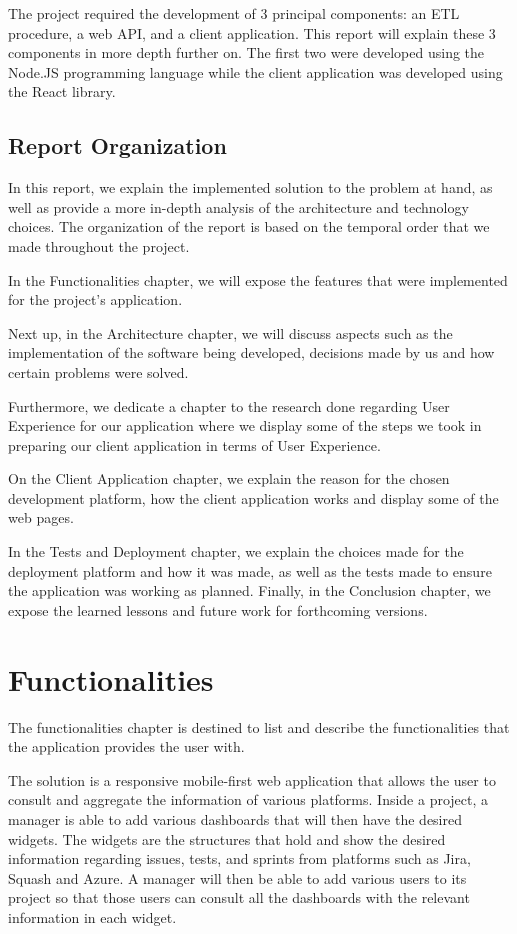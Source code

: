 \documentclass[a4paper,twoside,10pt]{report}
\begin{document}
The project required the development of 3 principal components: an ETL procedure, a web API, and a client application. This report will explain these 3 components in more depth further on.
The first two were developed using the Node.JS programming language while the client application was developed using the React library.

\section{Report Organization}
In this report, we explain the implemented solution to the problem at hand, as well as provide a more in-depth analysis of the architecture and technology choices. The organization of the report is based on the temporal order that we made throughout the project.

In the Functionalities chapter, we will expose the features that were implemented for the project's application.

Next up, in the Architecture chapter, we will discuss aspects such as the implementation of the software being developed, decisions made by us and how certain problems were solved.

Furthermore, we dedicate a chapter to the research done regarding User Experience for our application where we display some of the steps we took in preparing our client application in terms of User Experience.

On the Client Application chapter, we explain the reason for the chosen development platform, how the client application works and display some of the web pages.  

In the Tests and Deployment chapter, we explain the choices made for the deployment platform and how it was made, as well as the tests made to ensure the application was working as planned. Finally, in the Conclusion chapter, we expose the learned lessons and future work for forthcoming versions.

\chapter{Functionalities}

The functionalities chapter is destined to list and describe the functionalities that the application provides the user with.

The solution is a responsive mobile-first web application that allows the user to consult and aggregate the information of various platforms. Inside a project, a manager is able to add various dashboards that will then have the desired widgets. The widgets are the structures that hold and show the desired information regarding issues, tests, and sprints from platforms such as Jira\cite{JIRA}, Squash\cite{SQUASH} and Azure\cite{AZURE}. A manager will then be able to add various users to its project so that those users can consult all the dashboards with the relevant information in each widget.
\end{document}
